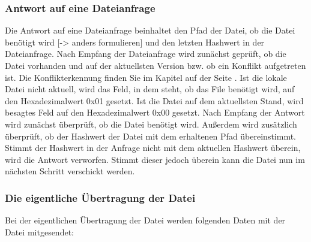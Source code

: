 \subsubsection*{Antwort auf eine Dateianfrage}
Die Antwort auf eine Dateianfrage beinhaltet den Pfad der Datei, ob die Datei benötigt wird [-> anders formulieren] und den letzten Hashwert in der Dateianfrage. Nach Empfang der Dateianfrage wird zunächst geprüft, ob die Datei vorhanden und auf der aktuellsten Version bzw. ob ein Konflikt aufgetreten ist. Die Konflikterkennung finden Sie im Kapitel  auf der Seite \pageref{Konflikterkennung}. Ist die lokale Datei nicht aktuell, wird das Feld, in dem steht, ob das File benötigt wird, auf den Hexadezimalwert 0x01 gesetzt. Ist die Datei auf dem aktuellsten Stand, wird besagtes Feld auf den Hexadezimalwert 0x00 gesetzt. 
Nach Empfang der Antwort wird zunächst überprüft, ob die Datei benötigt wird. Außerdem wird zusätzlich überprüft, ob der Hashwert der Datei mit dem erhaltenen Pfad übereinstimmt. Stimmt der Hashwert in der Anfrage nicht mit dem aktuellen Hashwert überein, wird die Antwort verworfen. Stimmt dieser jedoch überein kann die Datei nun im nächsten Schritt verschickt werden.

\subsubsection*{Die eigentliche Übertragung der Datei}
Bei der eigentlichen Übertragung der Datei werden folgenden Daten mit der Datei mitgesendet:
